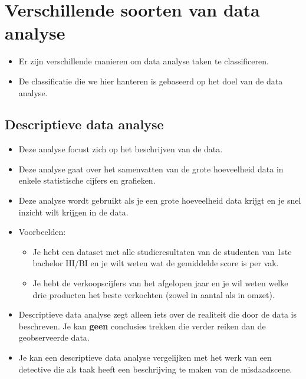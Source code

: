 \documentclass[]{memoir}
\providecommand{\tightlist}{%
  \setlength{\itemsep}{0pt}\setlength{\parskip}{0pt}}
\begin{document}
\section{Verschillende soorten van data
analyse}\label{verschillende-soorten-van-data-analyse}

\begin{itemize}
\tightlist
\item
  Er zijn verschillende manieren om data analyse taken te classificeren.
\item
  De classificatie die we hier hanteren is gebaseerd op het doel van de
  data analyse.
\end{itemize}

\subsection*{Descriptieve data analyse}\label{descriptieve-data-analyse}

\begin{itemize}
\tightlist
\item
  Deze analyse focust zich op het beschrijven van de data.
\item
  Deze analyse gaat over het samenvatten van de grote hoeveelheid data
  in enkele statistische cijfers en grafieken.
\item
  Deze analyse wordt gebruikt als je een grote hoeveelheid data krijgt
  en je snel inzicht wilt krijgen in de data.
\item
  Voorbeelden:

  \begin{itemize}
  \tightlist
  \item
    Je hebt een dataset met alle studieresultaten van de studenten van
    1ste bachelor HI/BI en je wilt weten wat de gemiddelde score is per
    vak.
  \item
    Je hebt de verkoopscijfers van het afgelopen jaar en je wil weten
    welke drie producten het beste verkochten (zowel in aantal als in
    omzet).
  \end{itemize}
\item
  Descriptieve data analyse zegt alleen iets over de realiteit die door
  de data is beschreven. Je kan \textbf{geen} conclusies trekken die
  verder reiken dan de geobserveerde data.
\item
  Je kan een descriptieve data analyse vergelijken met het werk van een
  detective die als taak heeft een beschrijving te maken van de
  misdaadscene.
\end{itemize}
\end{document}
